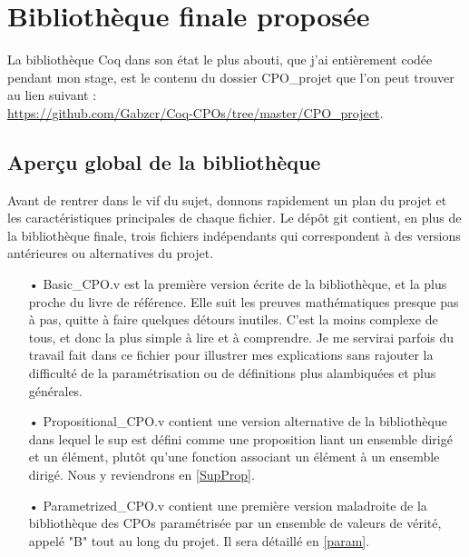\documentclass{article}
\newcommand\code[1]{{\fontfamily{lmtt}\selectfont #1}}
\theoremstyle{definition}
\begin{document}
\newpage

\section{Bibliothèque finale proposée}

La bibliothèque Coq dans son état le plus abouti, que j'ai entièrement codée pendant mon stage, est le contenu du dossier \code{CPO\_projet} que l'on peut trouver au lien suivant :\\ \href{https://github.com/Gabzcr/Coq-CPOs/tree/master/CPO\_project}{https://github.com/Gabzcr/Coq-CPOs/tree/master/CPO\_project}.

\subsection{Aperçu global de la bibliothèque}

Avant de rentrer dans le vif du sujet, donnons rapidement un plan du projet et les caractéristiques principales de chaque fichier. Le dépôt git contient, en plus de la bibliothèque finale, trois fichiers indépendants qui correspondent à des versions antérieures ou alternatives du projet.

\medskip

\begin{itemize}
\item[•] \code{Basic\_CPO.v} est la première version écrite de la bibliothèque, et la plus proche du livre de référence. Elle suit les preuves mathématiques presque pas à pas, quitte à faire quelques détours inutiles. C'est la moins complexe de tous, et donc la plus simple à lire et à comprendre. Je me servirai parfois du travail fait dans ce fichier pour illustrer mes explications sans rajouter la difficulté de la paramétrisation ou de définitions plus alambiquées et plus générales.
\item[•] \code{Propositional\_CPO.v} contient une version alternative de la bibliothèque dans lequel le sup est défini comme une proposition liant un ensemble dirigé et un élément, plutôt qu'une fonction associant un élément à un ensemble dirigé. Nous y reviendrons en \ref{SupProp}.
\item[•] \code{Parametrized\_CPO.v} contient une première version maladroite de la bibliothèque des CPOs paramétrisée par un ensemble de valeurs de vérité, appelé "B" tout au long du projet. Il sera détaillé en \ref{param}.
\end{itemize}

\medskip
\end{document}
